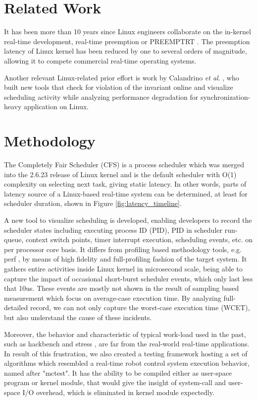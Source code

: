 \documentclass[conference]{IEEEtran}
\begin{document}
\section{Related Work}

It has been more than 10 years since Linux engineers collaborate on the in-kernel real-time development, real-time
preemption or PREEMPT\textunderscore RT \cite{rt-linux}. The preemption latency of Linux kernel has been reduced by
one to several orders of magnitude, allowing it to compete commercial real-time operating systems.

Another relevant Linux-related prior effort is work by Calandrino \textit{et al}. \cite{Lozi:2016:LSD:2901318.2901326},
who built new tools that check for violation of the invariant online and visualize scheduling activity while analyzing
performance degradation for synchronization-heavy application on Linux.

\section{Methodology}

    The Completely Fair Scheduler (CFS) is a process scheduler which was merged into the 2.6.23 release of Linux kernel
    and is the default scheduler with O(1) complexity on selecting next task, giving static latency. In other words, parts
    of latency source of a Linux-based real-time system can be determined, at least for scheduler duration, shown in
    Figure \ref{fig:latency_timeline}.

    A new tool to visualize scheduling is developed, enabling developers to record the scheduler states
    including executing process ID (PID), PID in scheduler run-queue, context switch points, timer interrupt execution,
    scheduling events, etc. on per processor core basis. It differs from profiling based methodology tools, e.g.
    perf \cite{perf}, by means of high fidelity and full-profiling fashion of the target system. It gathers entire
    activities inside Linux kernel in microsecond scale, being able to capture the impact of occasional short-burst
    scheduler events, which only last less that 10us. These events are mostly not shown in the result of sampling based
    measurement which focus on average-case execution time. By analyzing full-detailed record, we can not only
    capture the worst-case execution time (WCET), but also understand the cause of these incidents.

    Moreover, the behavior and characteristic of typical work-load used in the past, such as hackbench and stress \cite{rt-tests},
    are far from the real-world real-time applications. In result of this frustration, we also created a testing framework
    hosting a set of algorithms which resembled a real-time robot control system execution behavior, named after "mctest".
    It has the ability to be compiled either as user-space program or kernel module, that would give the insight of system-call
    and user-space I/O overhead, which is eliminated in kernel module expectedly.
\end{document}
